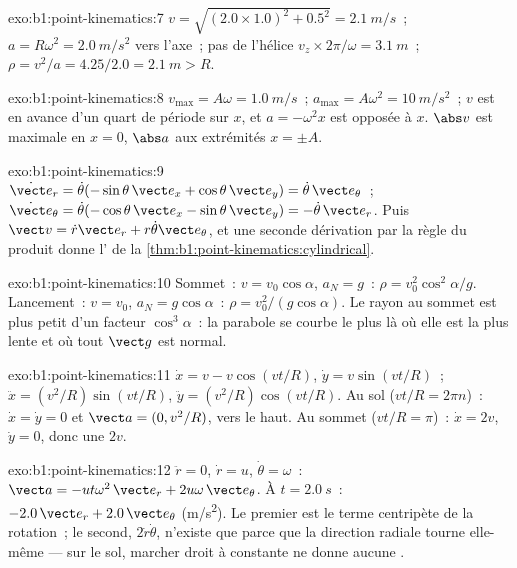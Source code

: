 \begin{solution}{exo:b1:point-kinematics:7}
$v = \sqrt{(2.0 \times 1.0)^2 + 0.5^2} = \qty{2.1}{m/s}$~; $a = R\omega^2 =
\qty{2.0}{m/s^2}$ vers l'axe~; pas de l'hélice $v_z \times 2\pi/\omega =
\qty{3.1}{m}$~; $\rho = v^2/a = 4.25/2.0 = \qty{2.1}{m} > R$.
\end{solution}

\begin{solution}{exo:b1:point-kinematics:8}
$v_{\max} = A\omega = \qty{1.0}{m/s}$~; $a_{\max} = A\omega^2 = \qty{10}{m/s^2}$~;
$v$ est en avance d'un quart de période sur $x$, et $a = -\omega^2x$ est
opposée à $x$. $\abs v$ est maximale en $x = 0$, $\abs a$ aux extrémités $x = \pm A$.
\end{solution}

\begin{solution}{exo:b1:point-kinematics:9}
$\dot{\vect e}_r = \dot\theta(-\sin\theta\,\vect e_x + \cos\theta\,\vect e_y)
= \dot\theta\,\vect e_\theta$~; $\dot{\vect e}_\theta = \dot\theta(-\cos\theta\,
\vect e_x - \sin\theta\,\vect e_y) = -\dot\theta\,\vect e_r$. Puis
$\vect v = \dot r\vect e_r + r\dot\theta\vect e_\theta$, et une seconde
dérivation par la règle du produit donne l' de la
\cref{thm:b1:point-kinematics:cylindrical}.
\end{solution}

\begin{solution}{exo:b1:point-kinematics:10}
Sommet~: $v = v_0\cos\alpha$, $a_N = g$~: $\rho = v_0^2\cos^2\alpha/g$.
Lancement~: $v = v_0$, $a_N = g\cos\alpha$~: $\rho = v_0^2/(g\cos\alpha)$.
Le rayon au sommet est plus petit d'un facteur $\cos^3\alpha$~: la
parabole se courbe le plus là où elle est la plus lente et où tout
$\vect g$ est normal.
\end{solution}

\begin{solution}{exo:b1:point-kinematics:11}
$\dot x = v - v\cos(vt/R)$, $\dot y = v\sin(vt/R)$~; $\ddot x = (v^2/R)
\sin(vt/R)$, $\ddot y = (v^2/R)\cos(vt/R)$. Au sol ($vt/R = 2\pi n$)~:
$\dot x = \dot y = 0$ et $\vect a = (0, v^2/R)$, vers le haut. Au sommet
($vt/R = \pi$)~: $\dot x = 2v$, $\dot y = 0$, donc une  $2v$.
\end{solution}

\begin{solution}{exo:b1:point-kinematics:12}
$\ddot r = 0$, $\dot r = u$, $\dot\theta = \omega$~: $\vect a = -ut\omega^2\,
\vect e_r + 2u\omega\,\vect e_\theta$. À $t = \qty{2.0}{s}$~: $-2.0\,\vect e_r
+ 2.0\,\vect e_\theta$ (\unit{m/s^2}). Le premier est le terme centripète
de la rotation~; le second, $2\dot r\dot\theta$, n'existe que parce que
la direction radiale tourne elle-même --- sur le sol, marcher droit à
 constante ne donne aucune .
\end{solution}

